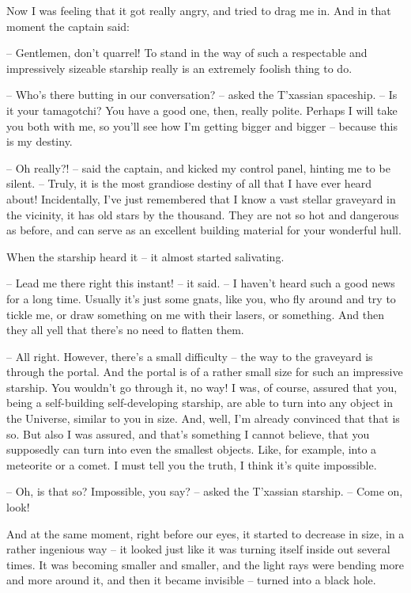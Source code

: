 \documentclass[ebook,twoside,final,openright]{memoir}
\begin{document}
\par
Now I was feeling that it got really angry, and tried to drag me in. And in that moment the captain said:\par
– Gentlemen, don’t quarrel! To stand in the way of such a respectable and impressively sizeable starship really is an extremely foolish thing to do.\par
– Who’s there butting in our conversation? – asked the T'xassian spaceship. – Is it your tamagotchi? You have a good one, then, really polite. Perhaps I will take you both with me, so you’ll see how I’m getting bigger and bigger – because this is my destiny.\par
– Oh really?! – said the captain, and kicked my control panel, hinting me to be silent. – Truly, it is the most grandiose destiny of all that I have ever heard about! Incidentally, I’ve just remembered that I know a vast stellar graveyard in the vicinity, it has old stars by the thousand. They are not so hot and dangerous as before, and can serve as an excellent building material for your wonderful hull.\par
When the starship heard it – it almost started salivating.\par
– Lead me there right this instant! – it said. – I haven’t heard such a good news for a long time. Usually it’s just some gnats, like you, who fly around and try to tickle me, or draw something on me with their lasers, or something. And then they all yell that there’s no need to flatten them.\par
– All right. However, there’s a small difficulty – the way to the graveyard is through the portal. And the portal is of a rather small size for such an impressive starship. You wouldn’t go through it, no way! I was, of course, assured that you, being a self-building self-developing starship, are able to turn into any object in the Universe, similar to you in size. And, well, I’m already convinced that that is so. But also I was assured, and that’s something I cannot believe, that you supposedly can turn into even the smallest objects. Like, for example, into a meteorite or a comet. I must tell you the truth, I think it’s quite impossible.\par
– Oh, is that so? Impossible, you say? – asked the T'xassian starship. – Come on, look!\par
\par
And at the same moment, right before our eyes, it started to decrease in size, in a rather ingenious way – it looked just like it was turning itself inside out several times. It was becoming smaller and smaller, and the light rays were bending more and more around it, and then it became invisible – turned into a black hole.\par
\end{document}
